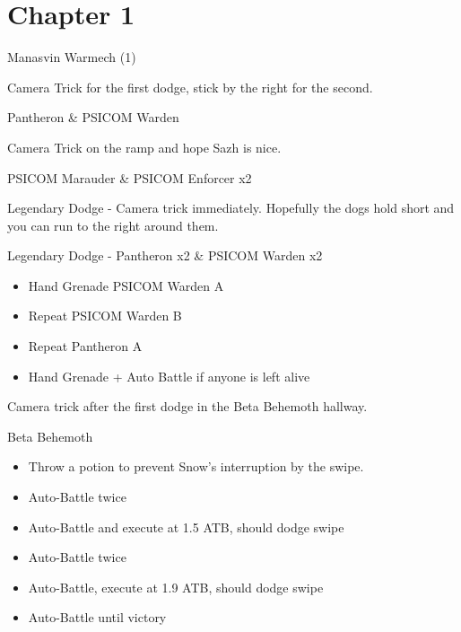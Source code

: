 \chapter{Chapter 1}

	\begin{battle}[1:06]{Manasvin Warmech (1)}
	\end{battle}

	Camera Trick for the first dodge, stick by the right for the second.

	\begin{battle}[0:16]{Pantheron \& PSICOM Warden}
	\end{battle}

	Camera Trick on the ramp and hope Sazh is nice.

	\begin{battle}[0:39]{PSICOM Marauder \& PSICOM Enforcer x2}
	\end{battle}

	Legendary Dodge - Camera trick immediately. Hopefully the dogs hold short and you can run to the right around them.

	\begin{battle}[0:18]{Legendary Dodge - Pantheron x2 \& PSICOM Warden x2}
		\begin{itemize}
			\item Hand Grenade PSICOM Warden A
			\item Repeat PSICOM Warden B
			\item Repeat Pantheron A
			\item Hand Grenade + Auto Battle if anyone is left alive
		\end{itemize}

	\end{battle}

	Camera trick after the first dodge in the Beta Behemoth hallway.

	\begin{battle}[0:51]{Beta Behemoth}
		\begin{itemize}
			\item Throw a potion to prevent Snow's interruption by the swipe.
			\item Auto-Battle twice
			\item Auto-Battle and execute at 1.5 ATB, should dodge swipe
			\item Auto-Battle twice
			\item Auto-Battle, execute at 1.9 ATB, should dodge swipe
			\item Auto-Battle until victory
		\end{itemize}
	\end{battle}

